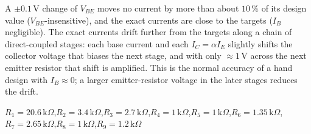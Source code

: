 \documentclass[11pt]{article}
\begin{document}
A $\pm0.1$\,V change of $V_{BE}$ moves no current by more than about $10\,\%$ of its design value ($V_{BE}$-insensitive), and the exact currents are close to the targets ($I_B$ negligible). The exact currents drift further from the targets along a chain of direct-coupled stages: each base current and each $I_C = \alpha I_E$ slightly shifts the collector voltage that biases the next stage, and with only $\approx1$\,V across the next emitter resistor that shift is amplified. This is the normal accuracy of a hand design with $I_B\approx0$; a larger emitter-resistor voltage in the later stages reduces the drift.
\begin{ansbox}
$R_{1} = 20.6\,\mathrm{k}\Omega$,\quad $R_{2} = 3.4\,\mathrm{k}\Omega$,\quad $R_{3} = 2.7\,\mathrm{k}\Omega$,\quad $R_{4} = 1\,\mathrm{k}\Omega$,\quad $R_{5} = 1\,\mathrm{k}\Omega$,\quad $R_{6} = 1.35\,\mathrm{k}\Omega$,\quad $R_{7} = 2.65\,\mathrm{k}\Omega$,\quad $R_{8} = 1\,\mathrm{k}\Omega$,\quad $R_{9} = 1.2\,\mathrm{k}\Omega$
\end{ansbox}

\newpage
\end{document}
